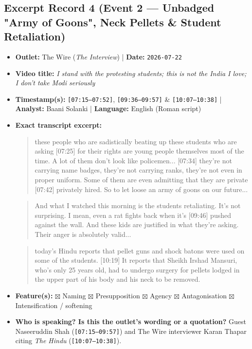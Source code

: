 \documentclass[10pt,a4paper]{article}
\begin{document}
\subsection*{Excerpt Record 4 (Event 2 --- Unbadged "Army of Goons", Neck Pellets \& Student Retaliation)}
\begin{itemize}[leftmargin=1.5em, itemsep=3pt, topsep=4pt]
  \item \textbf{Outlet:} The Wire (\textit{The Interview}) | \textbf{Date:} \texttt{2026-07-22}
  \item \textbf{Video title:} \textit{I stand with the protesting students; this is not the India I love; I don't take Modi seriously}
  \item \textbf{Timestamp(s):} \texttt{[07:15--07:52]}, \texttt{[09:36--09:57]} \& \texttt{[10:07--10:38]} | \textbf{Analyst:} Baani Solanki | \textbf{Language:} English (Roman script)
  \item \textbf{Exact transcript excerpt:}
    \begin{quote}\small{} these people who are sadistically beating up these students who are asking [07:25] for their rights are young people themselves most of the time. A lot of them don't look like policemen... [07:34] they're not carrying name badges, they're not carrying ranks, they're not even in proper uniform. Some of them are even admitting that they are private [07:42] privately hired. So to let loose an army of goons on our future...\end{quote}
    \begin{quote}\small\ttfamily [09:36] And what I watched this morning is the students retaliating. It's not surprising. I mean, even a rat fights back when it's [09:46] pushed against the wall. And these kids are justified in what they're asking. Their anger is absolutely valid...\end{quote}
    \begin{quote}\small{} today's Hindu reports that pellet guns and shock batons were used on some of the students. [10:19] It reports that Sheikh Irshad Mansuri, who's only 25 years old, had to undergo surgery for pellets lodged in the upper part of his body and his neck to be removed.\end{quote}
  \item \textbf{Feature(s):} $\boxtimes$ Naming $\boxtimes$ Presupposition $\boxtimes$ Agency $\boxtimes$ Antagonisation $\boxtimes$ Intensification / softening
  \item \textbf{Who is speaking? Is this the outlet's wording or a quotation?} Guest Naseeruddin Shah (\texttt{[07:15--09:57]}) and The Wire interviewer Karan Thapar citing \textit{The Hindu} (\texttt{[10:07--10:38]}).

\end{itemize}
\end{document}

